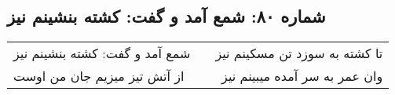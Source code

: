 \begin{center}
\section*{شماره ۸۰: شمع آمد و گفت: کشته بنشینم نیز}
\label{sec:080}
\begin{longtable}{l p{0.5cm} r}
شمع آمد و گفت: کشته بنشینم نیز
&&
تا کشته به سوزد تن مسکینم نیز
\\
از آتش تیز میزیم جان من اوست
&&
وان عمر به سر آمده میبینم نیز
\\
\end{longtable}
\end{center}

